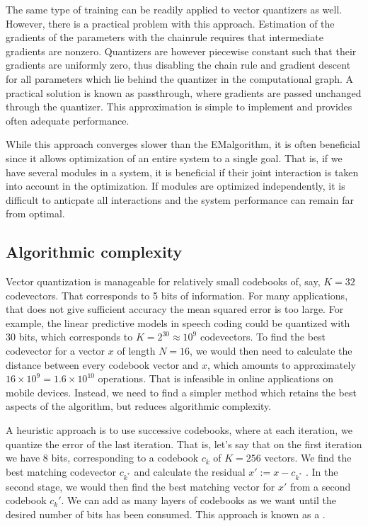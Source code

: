 \documentclass[letterpaper,10pt,english]{jupyterBook}
\begin{document}
\sphinxAtStartPar
The same type of training can be readily applied to vector quantizers as well. However, there is a practical problem with this approach. Estimation of the gradients of the parameters with the chain\sphinxhyphen{}rule requires that  intermediate gradients are non\sphinxhyphen{}zero. Quantizers are however piece\sphinxhyphen{}wise constant such that their gradients are uniformly zero, thus disabling the chain rule and gradient descent for all parameters which lie behind the quantizer in the computational graph. A practical solution is known as pass\sphinxhyphen{}through, where gradients are passed unchanged through the quantizer. This approximation is simple to implement and provides often adequate performance.

\sphinxAtStartPar
While this approach converges slower than the EM\sphinxhyphen{}algorithm, it is often beneficial since it allows optimization of an entire system to a single goal. That is, if we have several modules in a system, it is beneficial if their joint interaction is taken into account in the optimization. If modules are optimized independently, it is difficult to anticpate all interactions and the system performance can remain far from optimal.


\subsection{Algorithmic complexity}
\label{\detokenize{Modelling/Vector_quantization_VQ:algorithmic-complexity}}
\sphinxAtStartPar
Vector quantization is manageable for relatively small codebooks of,
say, \(K=32\) codevectors. That corresponds to 5 bits of information. For
many applications, that does not give sufficient accuracy \sphinxhyphen{} the mean
squared error is too large. For example, the linear predictive models in
speech coding could be quantized with 30 bits, which corresponds to \(
K=2^{30}\approx 10^9 \) codevectors. To find the best codevector for a
vector \(x\) of length \(N=16\), we would then need to calculate the
distance between every codebook vector and \(x\), which amounts to
approximately \( 16\times10^9= 1.6\times10^{10} \) operations. That
is infeasible in on\sphinxhyphen{}line applications on mobile devices. Instead, we
need to find a simpler method which retains the best aspects of the
algorithm, but reduces algorithmic complexity.

\sphinxAtStartPar
A heuristic approach is to use successive codebooks, where at each
iteration, we quantize the error of the last iteration. That is, let’s
say that on the first iteration we have 8 bits, corresponding to a
codebook \(c_{k}\) of \(K=256\) vectors. We find the best matching
codevector \(c_{k^*}\) and calculate the residual \(
x':=x-c_{k^*} \) . In the second stage, we would then find the best
matching vector for \(x'\) from a second codebook \(c_{k}'\). We can
add as many layers of codebooks as we want until the desired number of
bits has been consumed. This approach is known as a .
\end{document}

